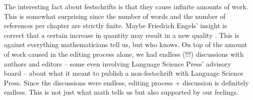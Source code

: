 \documentclass[output=paper,colorlinks,citecolor=brown]{langscibook}
\begin{document}
The interesting fact about festschrifts is that they cause infinite amounts of work. This is somewhat
surprising since the number of words and the number of references per chapter are strictly
finite. Maybe Friedrich Engels' insight is correct that a certain increase in quantity may result in a new
quality \citep[]{Engels1873a-u}. This is against everything mathematicians tell us, but who knows.
On top of the amount of work caused in the editing process alone, we had endless (!!!) discussions
with authors and editors -- some even involving Language Science Press' advisory board -- about what it meant to publish a non-festschrift with Language Science
Press. Since the discussions were endless, editing process + discussion is definitely endless. This
is not just what math tells us but also supported by our feelings.
\end{document}
